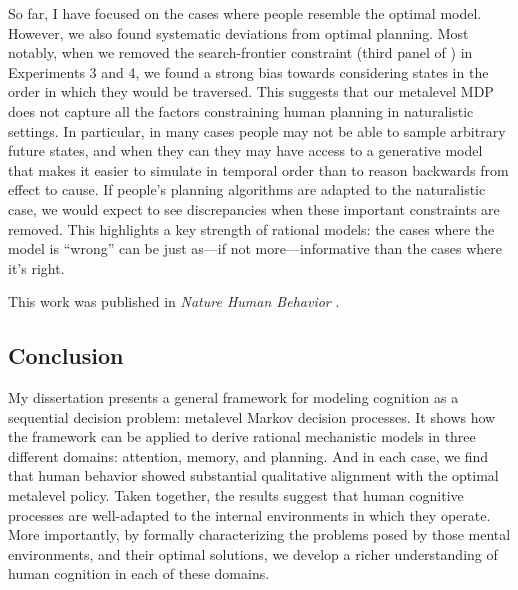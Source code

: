 \documentclass[11pt,a4paperpaper,]{article}
\begin{document}
So far, I have focused on the cases where people resemble the optimal model. However, we also found systematic deviations from optimal planning. Most notably, when we removed the search-frontier constraint (third panel of ) in Experiments 3 and 4, we found a strong bias towards considering states in the order in which they would be traversed. This suggests that our metalevel MDP does not capture all the factors constraining human planning in naturalistic settings. In particular, in many cases people may not be able to sample arbitrary future states, and when they can they may have access to a generative model that makes it easier to simulate in temporal order than to reason backwards from effect to cause. If people's planning algorithms are adapted to the naturalistic case, we would expect to see discrepancies when these important constraints are removed. This highlights a key strength of rational models: the cases where the model is ``wrong'' can be just as---if not more---informative than the cases where it's right.

This work was published in \emph{Nature Human Behavior} \citealp{callaway2022rational}.


\subsection{Conclusion}


My dissertation presents a general framework for modeling cognition as a sequential decision problem: metalevel Markov decision processes. It shows how the framework can be applied to derive rational mechanistic models in three different domains: attention, memory, and planning. And in each case, we find that human behavior showed substantial qualitative alignment with the optimal metalevel policy. Taken together, the results suggest that human cognitive processes are well-adapted to the internal environments in which they operate. More importantly, by formally characterizing the problems posed by those mental environments, and their optimal solutions, we develop a richer understanding of human cognition in each of these domains.
\end{document}
